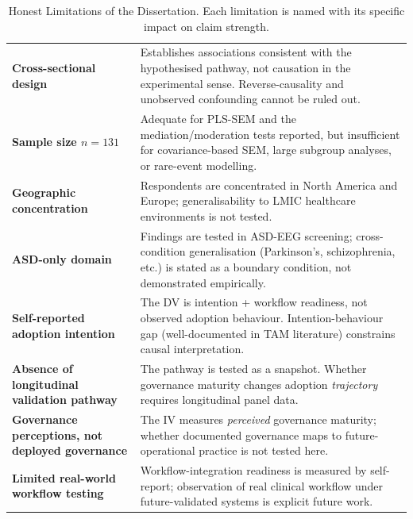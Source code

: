 {\tablestripes\tablefontsize
{}
\begin{xltabular}{\textwidth}{@{} >{\raggedright\arraybackslash}p{3.2cm} L @{}}
\caption[Honest Limitations]{Honest Limitations of the Dissertation. Each limitation is named with its specific impact on claim strength.}\label{tab:ch5_limitations} \\
\toprule
{} &  \\
\midrule
\endfirsthead
\endhead
\bottomrule
\endlastfoot
\textbf{Cross-sectional design}              & Establishes associations consistent with the hypothesised pathway, not causation in the experimental sense. Reverse-causality and unobserved confounding cannot be ruled out. \\
\textbf{Sample size $n=131$}                 & Adequate for PLS-SEM and the mediation/moderation tests reported, but insufficient for covariance-based SEM, large subgroup analyses, or rare-event modelling. \\
\textbf{Geographic concentration}            & Respondents are concentrated in North America and Europe; generalisability to LMIC healthcare environments is not tested. \\
\textbf{ASD-only domain}                     & Findings are tested in ASD-EEG screening; cross-condition generalisation (Parkinson's, schizophrenia, etc.) is stated as a boundary condition, not demonstrated empirically. \\
\textbf{Self-reported adoption intention}    & The DV is intention + workflow readiness, not observed adoption behaviour. Intention-behaviour gap (well-documented in TAM literature) constrains causal interpretation. \\
\textbf{Absence of longitudinal validation pathway} & The pathway is tested as a snapshot. Whether governance maturity changes adoption \emph{trajectory} requires longitudinal panel data. \\
\textbf{Governance perceptions, not deployed governance} & The IV measures \emph{perceived} governance maturity; whether documented governance maps to future-operational practice is not tested here. \\
\textbf{Limited real-world workflow testing} & Workflow-integration readiness is measured by self-report; observation of real clinical workflow under future-validated systems is explicit future work. \\

\end{xltabular}}
